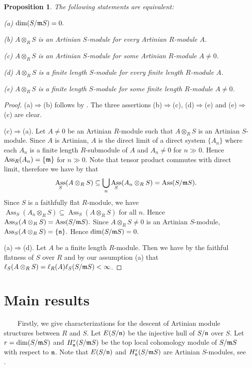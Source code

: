 \documentclass[a4papersize]{article}
\newtheorem{proposition}[theorem]{Proposition}
\DeclareMathOperator{\Ass}{Ass}
\begin{document}
\begin{proposition} \label{P:1a} The following statements are equivalent:

(a)  $\dim(S/\frak mS)=0.$

(b)   $A\otimes_RS$ is an Artinian $S$-module for every Artinian $R$-module $A$. 

(c) $A\otimes_RS$ is an Artinian $S$-module for some Artinian $R$-module $A\neq 0$.

(d) $A\otimes_RS$ is a finite length $S$-module for every finite length $R$-module $A$.
 
(e) $A\otimes_RS$ is a finite length $S$-module for some finite length $R$-module $A\neq 0$.
\end{proposition}

\begin{proof} (a)$\Rightarrow$(b) follows by \cite[Lemma 2.3]{NQ}. The three assertions (b)$\Rightarrow$(c), (d)$\Rightarrow$(e) and (e)$\Rightarrow$(c) are clear.

(c)$\Rightarrow$(a). Let $A\neq 0$ be an Artinian $R$-module such that $A\otimes_RS$ is an Artinian $S$-module. Since $A$ is Artinian, $A$ is the direct limit of a direct system $\{A_n\}$ where each $A_n$ is a finite length $R$-submodule of $A$ and $A_n\neq 0$ for $n\gg 0$.  Hence $\Ass_R(A_n)=\{\frak m\}$ for $n\gg 0$. Note that tensor product commutes with direct limit, therefore we have by \cite[Theorem 23.2]{Mat} that
 $$\Ass_S(A\otimes_RS)\subseteq \underset{n}{\bigcup}\Ass_S(A_n\otimes_RS)=\Ass (S/\frak mS).$$
Since $S$ is a faithfully flat $R$-module, we have $\Ass_S(A_n\otimes_RS)\subseteq \Ass_S(A\otimes_RS)$ for all $n$. Hence $\Ass_S(A\otimes_RS)=\Ass (S/\frak mS).$ Since $A\otimes_RS\neq 0$ is an Artinian $S$-module, $\Ass_S(A\otimes_RS)=\{\frak n\}.$ Hence $\dim (S/\frak mS)=0.$

(a)$\Rightarrow$(d). Let $A$ be a finite length $R$-module. Then we have by the faithful flatness of $S$ over $R$ and by our assumption (a) that $\ell_S(A\otimes_RS)=\ell_R(A)\ell_S(S/\frak mS)<\infty$.
\end{proof}


\section{Main results}

\ \ \ \ Firstly, we give characterizations for the descent of Artinian module structures between $R$ and $S$.   Let $E(S/\frak n)$ be the injective hull of $S/\frak n$ over $S$. Let $r=\dim(S/\frak mS)$ and $H^r_{\frak n}(S/\frak mS)$ be the top local cohomology module of $S/\frak mS$ with respect to $\frak n$. Note that   $E(S/\frak n)$ and $H^r_{\frak n}(S/\frak mS)$ are Artinian $S$-modules, see  \cite[Theorems 7.1.3, 10.2.5]{BS}.
\end{document}
